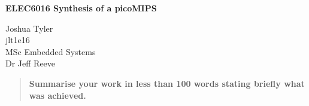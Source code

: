 


	
	
	\centering
	{\Large\bfseries ELEC6016  Synthesis of a picoMIPS \par}
	\vspace{1cm}
	{ Joshua Tyler\\
		jlt1e16\\
		MSc Embedded Systems\\
		Dr Jeff Reeve
		\par}
	\vspace{1cm}
	
\begin{abstract}
	{
		\color{red} \bfseries
		Summarise your work in less than 100 words stating briefly what was achieved.
	}
\end{abstract}



\clearpage







          

